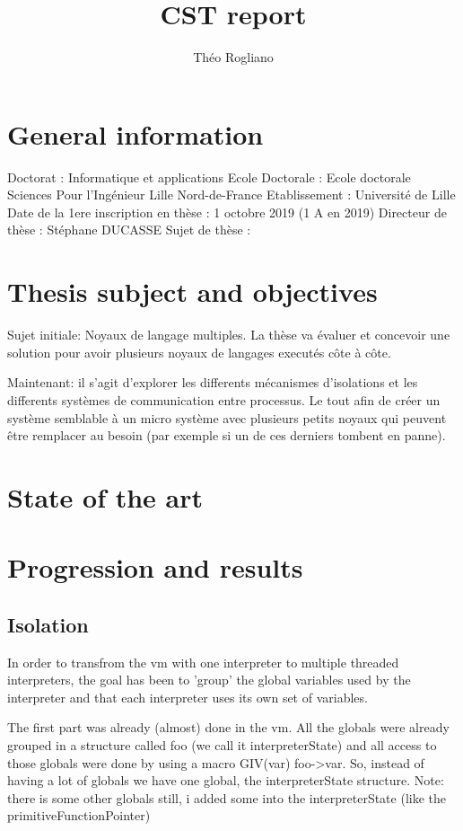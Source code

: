 \documentclass[11pt]{article} %
\title{CST report}
\author{Théo Rogliano}
\begin{document}
\maketitle

\section{General information}

Doctorat : Informatique et applications
Ecole Doctorale : Ecole doctorale Sciences Pour l'Ingénieur Lille Nord-de-France
Etablissement : Université de Lille
Date de la 1ere inscription en thèse : 1 octobre 2019 (1 A en 2019)
Directeur de thèse : Stéphane DUCASSE
Sujet de thèse : 

\section{Thesis subject and objectives}
Sujet initiale: Noyaux de langage multiples. La thèse va évaluer et concevoir une solution pour avoir plusieurs noyaux de langages executés côte à côte.

Maintenant: il s'agit d'explorer les differents mécanismes d'isolations et les differents systèmes de communication entre processus. Le tout afin de créer un système semblable à un micro système avec plusieurs petits noyaux qui peuvent être remplacer au besoin (par exemple si un de ces derniers tombent en panne).

\section{State of the art}
\section{Progression and results}
\subsection{Isolation}
In order to transfrom the vm with one interpreter to multiple threaded interpreters, the goal has been to 'group' the global variables used by the interpreter and that each interpreter uses its own set of variables.

The first part was already (almost) done in the vm. All the globals were already grouped in a structure called foo (we call it interpreterState) and all access to those globals were done by using a macro GIV(var) foo->var. So, instead of having a lot of globals we have one global, the interpreterState structure.
Note: there is some other globals still, i added some into the interpreterState (like the primitiveFunctionPointer)
\end{document}
